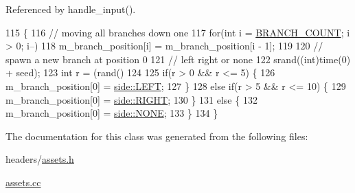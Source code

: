 Referenced by handle\+\_\+input().


\begin{DoxyCode}
115                                      \{    
116     \textcolor{comment}{// moving all branches down one}
117     \textcolor{keywordflow}{for}(\textcolor{keywordtype}{int} i = \hyperlink{assets_8h_a21bfb121481880074762e53e6ecef7c0}{BRANCH\_COUNT}; i > 0; i--) 
118         m\_branch\_position[i] = m\_branch\_position[i - 1];
119 
120     \textcolor{comment}{// spawn a new branch at position 0}
121     \textcolor{comment}{// left right or none}
122     srand((\textcolor{keywordtype}{int})time(0) + seed);
123     \textcolor{keywordtype}{int} r = (rand() %
124 
125     \textcolor{keywordflow}{if}(r > 0 && r <= 5) \{
126         m\_branch\_position[0] = \hyperlink{assets_8h_afc015eff6557e84151d2e53b94375445a684d325a7303f52e64011467ff5c5758}{side::LEFT};
127     \}
128     \textcolor{keywordflow}{else} \textcolor{keywordflow}{if}(r > 5 && r <= 10) \{
129         m\_branch\_position[0] = \hyperlink{assets_8h_afc015eff6557e84151d2e53b94375445a21507b40c80068eda19865706fdc2403}{side::RIGHT};
130     \}
131     \textcolor{keywordflow}{else} \{
132         m\_branch\_position[0] = \hyperlink{assets_8h_afc015eff6557e84151d2e53b94375445ab50339a10e1de285ac99d4c3990b8693}{side::NONE};
133     \}
134 \}
\end{DoxyCode}


The documentation for this class was generated from the following files\+:\begin{DoxyCompactItemize}
\item 
headers/\hyperlink{assets_8h}{assets.\+h}\item 
\hyperlink{assets_8cc}{assets.\+cc}\end{DoxyCompactItemize}
